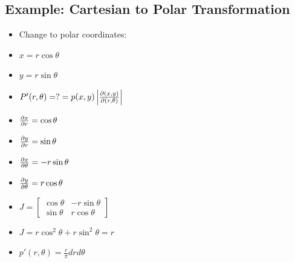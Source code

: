 \subsection{Example: Cartesian to Polar Transformation}
\begin{itemize}
    \item Change to polar coordinates:
    \item $x = r \cos{\theta}$
    \item $y = r \sin{\theta}$
    \item $P'(r, \theta) = ? = p(x,y) \left| \pdv{(x,y)}{(r,\theta)} \right|$

    \item $ \pdv{x}{r} = \cos{\theta}$
    \item $ \pdv{y}{r} = \sin{\theta}$
    \item $ \pdv{x}{\theta} = -r \sin{\theta}$
    \item $ \pdv{y}{\theta} = r \cos{\theta}$

    \item $J = \begin{bmatrix}
                  \cos{\theta} & -r \sin{\theta} \\
                  \sin{\theta} & r \cos{\theta}
              \end{bmatrix}$

    \item $ J = r \cos^2{\theta} + r \sin^2{\theta} = r$
    \item $p'(r, \theta) = \frac{r}{\pi} dr d\theta$
\end{itemize}
